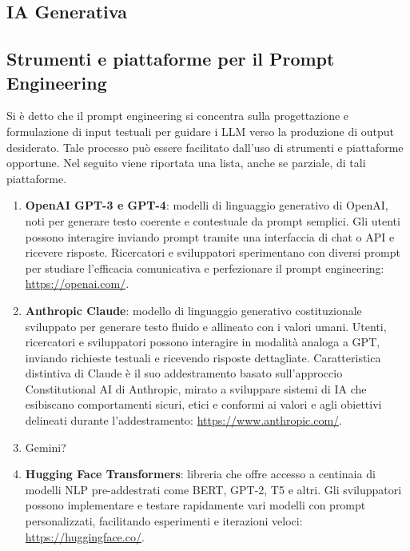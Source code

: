     \subsection{IA Generativa}

    \subsection{Strumenti e piattaforme per il Prompt Engineering}
        Si è detto che il prompt engineering si concentra sulla progettazione e formulazione di input testuali per guidare i LLM verso la produzione di output desiderato. Tale processo può essere facilitato dall'uso di strumenti e piattaforme opportune. Nel seguito viene riportata una lista, anche se parziale, di tali piattaforme. 

        \begin{enumerate}
            \item \textbf{OpenAI GPT-3 e GPT-4}: modelli di linguaggio generativo di OpenAI, noti per generare testo coerente e contestuale da prompt semplici. Gli utenti possono interagire inviando prompt tramite una interfaccia di chat o API e ricevere risposte. Ricercatori e sviluppatori sperimentano con diversi prompt per studiare l'efficacia comunicativa e perfezionare il prompt engineering: \url{https://openai.com/}. 

            \item \textbf{Anthropic Claude}: modello di linguaggio generativo costituzionale sviluppato per generare testo fluido e allineato con i valori umani. Utenti, ricercatori e sviluppatori possono interagire in modalità analoga a GPT, inviando richieste testuali e ricevendo risposte dettagliate. Caratteristica distintiva di Claude è il suo addestramento basato sull'approccio Constitutional AI di Anthropic, mirato a sviluppare sistemi di IA che esibiscano comportamenti sicuri, etici e conformi ai valori e agli obiettivi delineati durante l'addestramento: \url{https://www.anthropic.com/}. 

            \item Gemini?

            \item \textbf{Hugging Face Transformers}: libreria che offre accesso a centinaia di modelli NLP pre-addestrati come BERT, GPT-2, T5 e altri. Gli sviluppatori possono implementare e testare rapidamente vari modelli con prompt personalizzati, facilitando esperimenti e iterazioni veloci: \url{https://huggingface.co/}. 


\end{enumerate}
